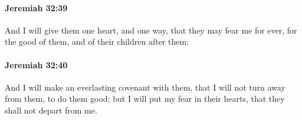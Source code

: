 		\paragraph{Jeremiah 32:39} %
			\label{JEREMIAH-32-39}

			And I will give them one heart, and one way, that they may fear me for ever, for the good of them, and of their children after them:


		\paragraph{Jeremiah 32:40} %
			\label{JEREMIAH-32-40}

			And I will make an everlasting covenant with them, that I will not turn away from them, to do them good; but I will put my fear in their hearts, that they shall not depart from me.


